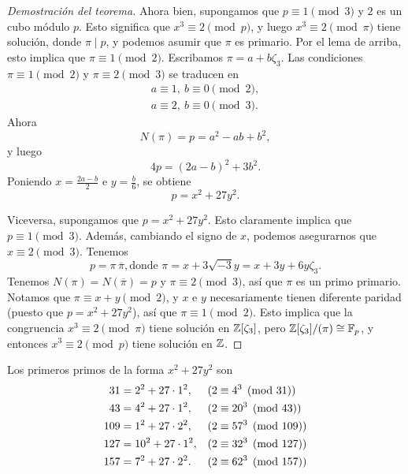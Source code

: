 \begin{proof}[Demostración del teorema]
  Ahora bien, supongamos que $p \equiv 1 \pmod{3}$ y $2$ es un cubo
  módulo $p$. Esto significa que $x^3 \equiv 2 \pmod{p}$, y luego
  $x^3 \equiv 2 \pmod{\pi}$ tiene solución, donde $\pi \mid p$, y podemos asumir
  que $\pi$ es primario. Por el lema de arriba, esto implica que
  $\pi \equiv 1 \pmod{2}$. Escribamos $\pi = a + b\zeta_3$. Las condiciones
  $\pi \equiv 1 \pmod{2}$ y $\pi \equiv 2 \pmod{3}$ se traducen en
  \begin{gather*}
    a \equiv 1, ~ b \equiv 0 \pmod{2},\\
    a \equiv 2, ~ b \equiv 0 \pmod{3}.
  \end{gather*}
  Ahora
  $$N (\pi) = p = a^2 - ab + b^2,$$
  y luego
  $$4p = (2a - b)^2 + 3b^2.$$
  Poniendo $x = \frac{2a - b}{2}$ e $y = \frac{b}{6}$, se obtiene
  $$p = x^2 + 27 y^2.$$

  Viceversa, supongamos que $p = x^2 + 27 y^2$. Esto claramente implica que
  $p \equiv 1 \pmod{3}$. Además, cambiando el signo de $x$, podemos asegurarnos
  que $x \equiv 2 \pmod{3}$. Tenemos
  \[ p = \pi \, \overline{\pi},
         \text{donde }\pi = x + 3\sqrt{-3}y = x + 3y + 6y\zeta_3. \]
  Tenemos $N (\pi) = N (\overline{\pi}) = p$ y $\pi \equiv 2\pmod{3}$, así que
  $\pi$ es un primo primario. Notamos que $\pi \equiv x+y \pmod{2}$, y $x$ e $y$
  necesariamente tienen diferente paridad (puesto que $p = x^2 + 27y^2$), así
  que $\pi \equiv 1 \pmod{2}$. Esto implica que la congruencia
  $x^3 \equiv 2 \pmod{\pi}$ tiene solución en $\mathbb{Z} [\zeta_3]$, pero
  $\mathbb{Z} [\zeta_3]/(\pi) \cong \mathbb{F}_p$, y entonces $x^3 \equiv 2 \pmod{p}$ tiene
  solución en $\mathbb{Z}$.
\end{proof}

\begin{ejemplo}
  Los primeros primos de la forma $x^2 + 27 y^2$ son
  \begin{align*}
     31 & = 2^2 + 27\cdot 1^2,  & (2 & \equiv 4^3 \pmod{31}) \\
     43 & = 4^2 + 27\cdot 1^2,  & (2 & \equiv 20^3 \pmod{43}) \\
    109 & = 1^2 + 27\cdot 2^2,  & (2 & \equiv 57^3 \pmod{109}) \\
    127 & = 10^2 + 27\cdot 1^2, & (2 & \equiv 32^3 \pmod{127}) \\
    157 & = 7^2 + 27\cdot 2^2.  & (2 & \equiv 62^3 \pmod{157}) \qedhere
  \end{align*}
\end{ejemplo}

